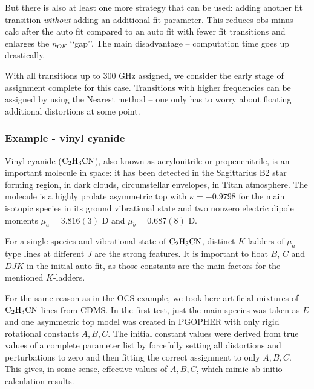 \documentclass[11pt]{article}
\begin{document}
But there is also at least one more strategy that can be used: adding another fit transition \emph{without} adding an additional fit parameter. This reduces obs minus calc after the auto fit compared to an auto fit with fewer fit transitions and enlarges the $n_{OK}$ \lq\lq{}gap\rq\rq{}. The main disadvantage -- computation time goes up drastically. %

With all transitions up to 300 GHz assigned, we consider the early stage of assignment complete for this case. Transitions with higher frequencies can be assigned by using the Nearest method -- one only has to worry about floating additional distortions at some point. 

\subsubsection{Example - vinyl cyanide}

Vinyl cyanide ($\rm C_2H_3CN$), also known as acrylonitrile or propenenitrile, is an important molecule in space: it has been detected in the Sagittarius B2 star forming region, in dark clouds, circumstellar envelopes, in Titan atmosphere. The molecule is a highly prolate asymmetric top with $\kappa = -0.9798$ for the main isotopic species in its ground vibrational state and two nonzero electric dipole moments $\mu_a = 3.816(3)$ D and $\mu_b = 0.687(8)$ D.  

For a single species and vibrational state of $\rm C_2H_3CN$, 
distinct $K$-ladders of $\mu_a$-type lines at different $J$ are the strong features. %
It is important to float $B$, $C$ and $DJK$ in the initial auto fit, as those constants are the main factors for the mentioned $K$-ladders. 


For the same reason as in the OCS example, we took here artificial mixtures of $\rm C_2H_3CN$ lines from CDMS. In the first test, just the main species was taken as $E$ and one asymmetric top model was created in PGOPHER with only rigid rotational constants $A, B, C$. The initial constant values were derived from true values of a complete parameter list by forcefully setting all distortions and perturbations to zero and then fitting the correct assignment to only $A, B, C$. This gives, in some sense, effective values of $A, B, C$, which mimic ab initio calculation results. %
\end{document}
